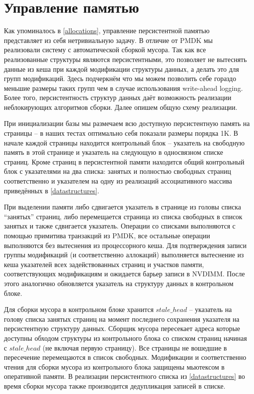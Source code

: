 \documentclass[pdftex,ptm,12pt,a4paper]{report}
\theoremstyle{definition}
\begin{document}
\section{Управление памятью}
\label{gc}
Как упоминалось в \ref{allocations}, управление персистентной памятью представляет из себя нетривиальную задачу.
В отличие от PMDK мы реализовали систему с автоматической сборкой мусора. Так как все реализованные структуры являются персистентными, это позволяет не вытеснять данные из кеша
при каждой модификации структуры данных, а делать это для групп модификаций. Здесь подчеркнём что мы можем позволить себе гораздо меньшие размеры
таких групп чем в случае использования write-ahead logging. Более того, персистентность структур данных даёт возможность реализации неблокирующих алгоритмов сборки.
Далее опишем общую схему реализации.

При инициализации базы мы размечаем всю доступную персистентную память на страницы -- в наших тестах оптимально себя показали размеры порядка 1K.
В начале каждой страницы находится контрольный блок -- указатель на свободную память в этой странице и указатель на следующую в односвязном списке страниц.
Кроме страниц в персистентной памяти находится общий контрольный блок с указателями на два списка: занятых и полностью свободных страниц соответственно и
указателем на одну из реализаций ассоциативного массива приведённых в \ref{datastructures}.

При выделении памяти либо сдвигается указатель в странице из головы списка ``занятых'' страниц, либо перемещается страница из списка свободных в список занятых и также сдвигается указатель. Операции со списками выполняются с помощью примитива транзакций из PMDK, все остальные операции выполняются без вытеснения из процессорного кеша. Для подтверждения записи группы
модификаций (и соответственно аллокаций) выполняется вытеснение из кеша указателей всех задействованных страниц и участков памяти, соответствующих модификациям
и ожидается барьер записи в NVDIMM. После этого аналогично обновляется указатель на структуру данных в контрольном блоке.

Для сборки мусора в контрольном блоке хранится $stale\_head$ -- указатель на голову списка занятых страниц на момент последнего сохранения указателя на персистентную структуру данных.
Сборщик мусора пересекает адреса которые доступны обходом структуры из контрольного блока со списком страниц начиная с $stale\_head$ (не включая первую страницу).
Все страницы не вошедшие в пересечение перемещаются в список свободных. Модификации и соответственно чтения для сборки мусора из контрольного блока защищены
мьютексом в оперативной памяти. В реализации персистентного списка из \ref{datastructures} во время сборки мусора также производится дедупликация записей в списке.
\end{document}
